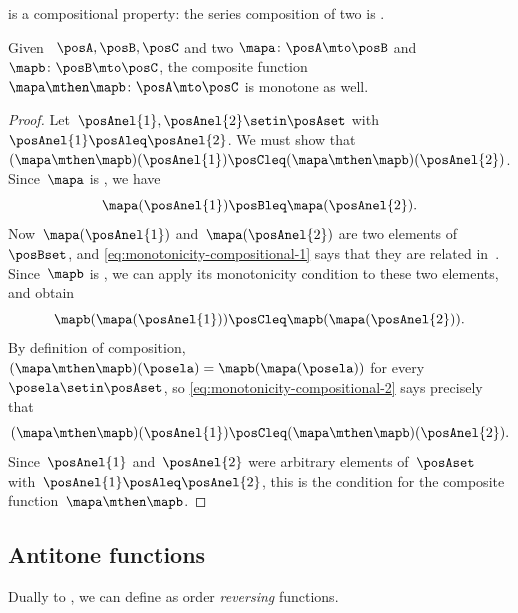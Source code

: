 is a compositional property: the series composition of two  is .
\begin{lemma}\label{lem:monotonicity-compositional}
    Given ~$\posA,\posB,\posC$ and two 
    $\mapa\colon \posA \mto \posB$ and $\mapb\colon \posB \mto \posC$, the composite function~$\mapa\mthen \mapb\colon \posA \mto \posC$ is monotone as well.
\end{lemma}
\begin{proof}
    Let~$\posAnel{1},\posAnel{2} \setin \posAset$ with~$\posAnel{1}\posAleq \posAnel{2}$.
    We must show that~$(\mapa\mthen \mapb)(\posAnel{1}) \posCleq (\mapa\mthen \mapb)(\posAnel{2})$.
    Since~$\mapa$ is , we have
    \begin{equation}\label{eq:monotonicity-compositional-1}
        \mapa(\posAnel{1})\posBleq \mapa(\posAnel{2}).
    \end{equation}
    Now~$\mapa(\posAnel{1})$ and~$\mapa(\posAnel{2})$ are two elements of~$\posBset$, and \cref{eq:monotonicity-compositional-1} says that they are related in~\posB.
    Since~$\mapb$ is , we can apply its monotonicity condition to these two elements, and obtain
    \begin{equation}\label{eq:monotonicity-compositional-2}
        \mapb(\mapa(\posAnel{1}))\posCleq \mapb(\mapa(\posAnel{2})).
    \end{equation}
    By definition of composition,~$(\mapa\mthen \mapb)(\posela) = \mapb(\mapa(\posela))$ for every~$\posela \setin \posAset$, so \cref{eq:monotonicity-compositional-2} says precisely that
    \begin{equation}\label{eq:monotonicity-compositional-3}
        (\mapa\mthen \mapb)(\posAnel{1}) \posCleq (\mapa\mthen \mapb)(\posAnel{2}).
    \end{equation}
    Since~$\posAnel{1}$ and~$\posAnel{2}$ were arbitrary elements of~$\posAset$ with~$\posAnel{1}\posAleq \posAnel{2}$, this is the  condition for the composite function~$\mapa\mthen\mapb$.
\end{proof}


\subsection{Antitone functions}

Dually to , we can define  as order \emph{reversing} functions.

